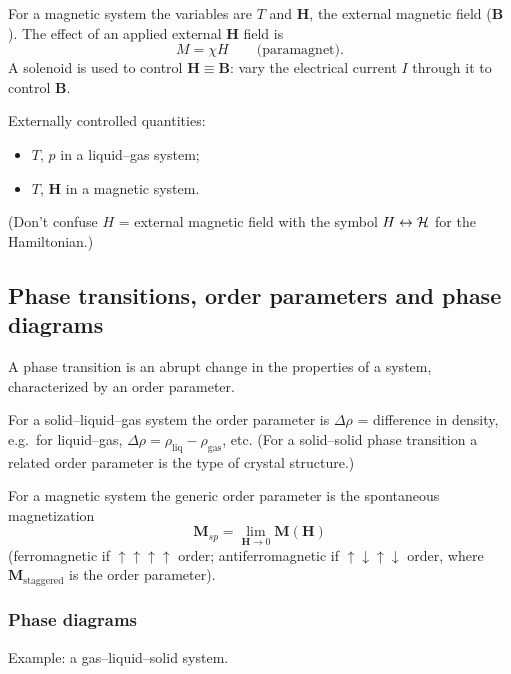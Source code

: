 For a magnetic system the variables are $T$ and $\mathbf{H}$, the external magnetic
field ($\mathbf{B}$). The effect of an applied external $\mathbf{H}$ field is
\begin{equation}
  M = \chi H \qquad\text{(paramagnet)}.
\end{equation}
A solenoid is used to control $\mathbf{H}\equiv\mathbf{B}$: vary the electrical
current $I$ through it to control $\mathbf{B}$.

Externally controlled quantities:
\begin{itemize}
  \item $T$, $p$ in a liquid--gas system;
  \item $T$, $\mathbf{H}$ in a magnetic system.
\end{itemize}
(Don't confuse $H$ = external magnetic field with the symbol $H\leftrightarrow\mathcal{H}$
for the Hamiltonian.)

\subsection{Phase transitions, order parameters and phase diagrams}

A phase transition is an abrupt change in the properties of a system,
characterized by an order parameter.

For a solid--liquid--gas system the order parameter is $\Delta\rho$ = difference in
density, e.g.\ for liquid--gas, $\Delta\rho = \rho_{\mathrm{liq}}-\rho_{\mathrm{gas}}$,
etc. (For a solid--solid phase transition a related order parameter is the type of
crystal structure.)

For a magnetic system the generic order parameter is the spontaneous magnetization
\begin{equation}
  \mathbf{M}_{sp} = \lim_{\mathbf{H}\to 0}\mathbf{M}(\mathbf{H})
\end{equation}
(ferromagnetic if $\uparrow\uparrow\uparrow\uparrow$ order; antiferromagnetic if
$\uparrow\downarrow\uparrow\downarrow$ order, where $\mathbf{M}_{\text{staggered}}$ is
the order parameter).

\subsubsection*{Phase diagrams}

Example: a gas--liquid--solid system.

